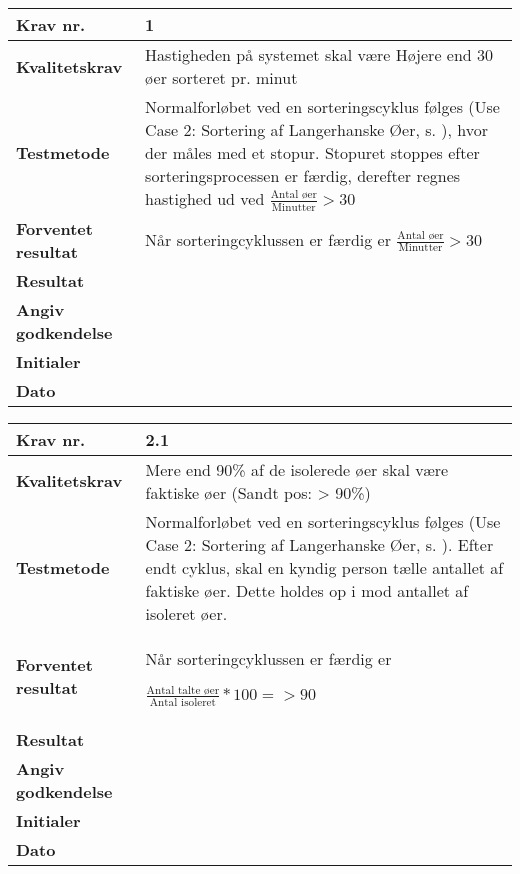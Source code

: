 
 	\begin{center}
		\begin{longtable}{ | m{4cm}| m{8.5cm}|} 
			\hline
			\textbf{Krav nr.} & 1 \\ 
			\hline
			\textbf{Kvalitetskrav} & Hastigheden på systemet skal være Højere end 30 øer sorteret pr. minut \\
			\hline
			\textbf{Testmetode} & Normalforløbet ved en sorteringscyklus følges (Use Case 2: Sortering af Langerhanske Øer, s. \pageref{uc:2}), hvor der måles med et stopur. Stopuret stoppes efter sorteringsprocessen er færdig, derefter regnes hastighed ud ved 
$\frac{\text{Antal øer}}{\text{Minutter}}>30$ \\
			\hline
			\textbf{Forventet resultat}  & Når sorteringcyklussen er færdig er
			$\frac{\text{Antal øer}}{\text{Minutter}}>30$  \\
			\hline
			\textbf{Resultat}  &    \\
			\hline
			\textbf{Angiv godkendelse} &     \\
			\hline
			\textbf{Initialer} &     \\
			\hline
			\textbf{Dato} &    \\
			\hline
		\end{longtable}
	\end{center}
			
 	\begin{center}
		\begin{longtable}{ | m{4cm}| m{8.5cm}|} 
			\hline
			\textbf{Krav nr.} & 2.1 \\ 
			\hline
			\textbf{Kvalitetskrav} & Mere end 90\% af de isolerede øer skal være faktiske øer 
(Sandt pos: > 90\%) \\
			\hline
			\textbf{Testmetode} & Normalforløbet ved en sorteringscyklus følges (Use Case 2: Sortering af Langerhanske Øer, s. \pageref{uc:2}). Efter endt cyklus, skal en kyndig person tælle antallet af faktiske øer. Dette holdes op i mod antallet af isoleret øer.  \\
			\hline
			\textbf{Forventet resultat}  & Når sorteringcyklussen er færdig er

 $\frac{\text{Antal talte øer}}{\text{Antal isoleret}}*100=>90$  \\
			\hline
			\textbf{Resultat}  &    \\
			\hline
			\textbf{Angiv godkendelse} &     \\
			\hline
			\textbf{Initialer} &     \\
			\hline
			\textbf{Dato} &    \\
			\hline
		\end{longtable}
	\end{center}		

